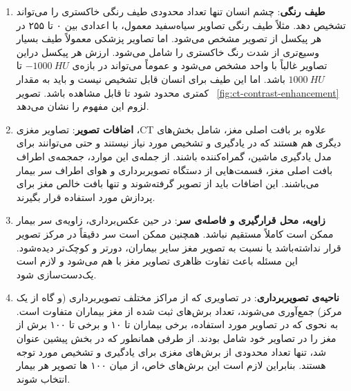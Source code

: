 \begin{enumerate}
        \item \textbf{طیف رنگی}:  چشم انسان تنها تعداد محدودی طیف رنگی خاکستری را می‌تواند تشخیص دهد. مثلاً طیف رنگی تصاویر سیاه‌سفید معمول، با اعدادی بین ۰ تا ۲۵۵ در هر پیکسل از تصویر مشخص می‌شود.
        اما تصاویر پزشکی معمولاً طیف بسیار وسیع‌تری از شدت رنگ خاکستری را شامل می‌شود. 
        ارزش هر پیکسل دراین تصاویر غالباً با واحد  مشخص می‌شود و عموماً می‌تواند در بازه‌ی $-1000\ HU$ تا $1000\ HU$ باشد.
        اما این طیف برای انسان قابل تشخیص نیست و باید به مقدار کمتری محدود شود تا قابل مشاهده باشد. 
         تصویر ~\ref{fig:ct-contrast-enhancement} لزوم این مفهوم را نشان می‌دهد.
        \item \textbf{اضافات تصویر}: تصاویر مغزی ،CT علاوه بر بافت اصلی مغز، شامل بخش‌های دیگری هم هستند که در یادگیری و تشخیص مورد نیاز نیستند و حتی می‌توانند برای مدل یادگیری ماشین، گمراه‌کننده باشند.
        از جمله‌ی این موارد، جمجمه‌ی اطراف بافت اصلی مغز، قسمت‌هایی از دستگاه تصویربرداری و هوای اطراف سر بیمار می‌باشند.
        این اضافات باید از تصویر گرفته‌شوند و تنها بافت خالص مغز برای پردازش مورد استفاده قرار بگیرند.
        \item \textbf{زاویه، محل قرار‌گیری و فاصله‌ی سر}: در حین عکس‌برداری، زاویه‌ی سر بیمار ممکن است کاملاً مستقیم نباشد.
        همچنین ممکن است سر دقیقاً در مرکز تصویر قرار نداشته‌باشد یا نسبت به تصویر مغز سایر بیماران، دورتر و کوچک‌تر دیده‌شود.
        این مسئله باعث تفاوت ظاهری تصاویر مغز با هم می‌شود و لازم است یک‌دست‌سازی شود.
        \item \textbf{ناحیه‌ی تصویربرداری}: در تصاویری که از مراکز مختلف تصویربرداری (و گاه از یک مرکز) جمع‌آوری می‌شوند، 
        تعداد برش‌های ثبت شده از مغز بیماران متفاوت است.
        به نحوی که در تصاویر مورد استفاده، برخی بیماران تا ۱۰ و برخی تا ۱۰۰ برش از مغز را در تصاویر خود شامل بودند.
        از طرفی همانطور که در بخش پیشین عنوان شد، تنها تعداد محدودی از برش‌های مغزی برای یادگیری و تشخیص مورد توجه هستند.
        بنابراین لازم است این برش‌های خاص، از میان ۱۰۰ ها تصویر هر بیمار انتخاب شوند. 
\end{enumerate}


